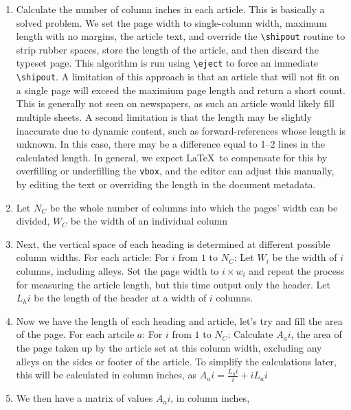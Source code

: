 \documentclass[a4paper]{scrartcl}
\begin{document}
\begin{enumerate}
  \item Calculate the number of column inches in each article.
    \subitem[*] This is basically a solved problem. We set the page
    width to single-column width, maximum length with no margins,
    \verb!! the article text, and override the \verb!\shipout!
    routine to strip rubber spaces, store the length of the article,
    and then discard the typeset page. This algorithm is run using
    \verb!\eject! to force an immediate \verb!\shipout!.
    \subitem[*] A limitation of this approach is that an article that
    will not fit on a single page will exceed the maximium page length
    and return a short count. This is generally not seen on
    newspapers, as such an article would likely fill multiple sheets.
    \subitem[*] A second limitation is that the length may be slightly
    inaccurate due to dynamic content, such as forward-references
    whose length is unknown. In this case, there may be a difference
    equal to 1--2 lines in the calculated length. In general, we
    expect \LaTeX\ to compensate for this by overfilling or
    underfilling the \verb!vbox!, and the editor can adjust this
    manually, by editing the text or overriding the length in the
    document metadata.
    \item Let $N_C$ be the whole number of columns into which the
      pages' width can be divided, $W_C$ be the width of an individual
      column
    \item Next, the vertical space of each heading is determined at
      different possible column widths. For each article:
      \subitem For $i$ from $1$ to $N_C$:
      \subsubitem Let $W_i$ be the width of $i$ columns, including alleys.
      \subsubitem Set the page width to $i \times w_i$ and repeat the
      process for measuring the article length, but this time output
      only the header.
      \subsubitem Let $L_hi$ be the length of the header at a width of $i$ columns.
    \item Now we have the length of each heading and article, let's
      try and fill the area of the page. For each artcile $a$:
      \subitem For $i$ from $1$ to $N_C$: \subitem Calculate $A_ai$,
      the area of the page taken up by the article set at this column
      width, excluding any alleys on the sides or footer of the
      article. To simplify the calculations later, this will be
      calculated in column inches, as $A_ai = \frac{L_hi}{i} + i L_ai$
    \item We then have a matrix of values $A_ai$, in column inches,

\end{enumerate}
\end{document}
